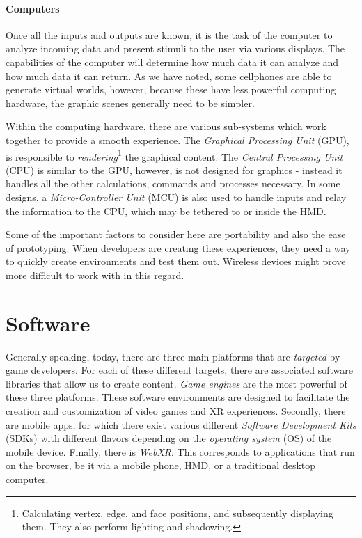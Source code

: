 \paragraph{Computers}

Once all the inputs and outputs are known, it is the task of the computer to analyze incoming data and present stimuli to the user via various displays. The capabilities of the computer will determine how much data it can analyze and how much data it can return. As we have noted, some cellphones are able to generate virtual worlds, however, because these have less powerful computing hardware, the graphic scenes generally need to be simpler. 

Within the computing hardware, there are various sub-systems which work together to provide a smooth experience. The \textit{Graphical Processing Unit} (GPU), is responsible to \textit{rendering}\footnote{Calculating vertex, edge, and face positions, and subsequently displaying them. They also perform lighting and shadowing.} the graphical content. The \textit{Central Processing Unit} (CPU) is similar to the GPU, however, is not designed for graphics - instead it handles all the other calculations, commands and processes necessary. In some designs, a \textit{Micro-Controller Unit} (MCU) is also used to handle inputs and relay the information to the CPU, which may be tethered to or inside the HMD.

Some of the important factors to consider here are portability and also the ease of prototyping. When developers are creating these experiences, they need a way to quickly create environments and test them out. Wireless devices might prove more difficult to work with in this regard.


\section{Software}

Generally speaking, today, there are three main platforms that are \textit{targeted} by game developers. For each of these different targets, there are associated software libraries that allow us to create content. \textit{Game engines} are the most powerful of these three platforms. These software environments are designed to facilitate the creation and customization of video games and XR experiences. Secondly, there are mobile apps, for which there exist various different \textit{Software Development Kits} (SDKs) with different flavors depending on the \textit{operating system} (OS) of the mobile device. Finally, there is \textit{WebXR}. This corresponds to applications that run on the browser, be it via a mobile phone, HMD, or a traditional desktop computer. 

